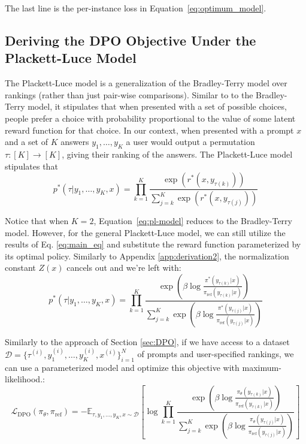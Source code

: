 \documentclass{article}
\newcommand{\piref}{\pi_\text{ref}}
\begin{document}
The last line is the per-instance loss in Equation~\ref{eq:optimum_model}.

\subsection{Deriving the DPO Objective Under the Plackett-Luce Model}
\label{app:plackett_luce_models}
The Plackett-Luce model \citep{plackett1975analysis, luce2012individual} is a generalization of the Bradley-Terry model over rankings (rather than just pair-wise comparisons). Similar to to the Bradley-Terry model, it stipulates that when presented with a set of possible choices, people prefer a choice with probability proportional to the value of some latent reward function for that choice. In our context, when presented with a prompt $x$ and a set of $K$ answers $y_1, \ldots, y_K$ a user would output a permutation $\tau:[K]\to[K]$, giving their ranking of the answers. The Plackett-Luce model stipulates that
\begin{equation}\label{eq:pl-model}
    p^*(\tau| y_1,\ldots, y_K, x)= \prod_{k=1}^{K}\frac{\exp(r^*(x, y_{\tau(k)}))}{\sum_{j=k}^{K}\exp(r^*(x, y_{\tau(j)}))}
\end{equation}

Notice that when $K=2$, Equation~\ref{eq:pl-model} reduces to the Bradley-Terry model. However, for the general Plackett-Luce model, we can still utilize the results of Eq. \ref{eq:main_eq} and substitute the reward function parameterized by its optimal policy. Similarly to Appendix \ref{app:derivation2}, the normalization constant $Z(x)$ cancels out and we're left with:
\begin{equation}
    p^*(\tau| y_1,\ldots, y_K, x)= \prod_{k=1}^{K}\frac{\exp\left(\beta \log \frac{\pi^*(y_{\tau(k)}|x)}{\piref(y_{\tau(k)}|x)}\right)}{\sum_{j=k}^{K}\exp\left(\beta \log \frac{\pi^*(y_{\tau(j)}|x)}{\piref(y_{\tau(j)}|x)}\right)}
\end{equation}

Similarly to the approach of Section \ref{sec:DPO}, if we have access to a dataset $\mathcal{D} = \{\tau^{(i)}, y_1^{(i)}, \ldots, y_K^{(i)}, x^{(i)}\}_{i=1}^N$ of prompts and user-specified rankings, we can use a parameterized model and optimize this objective with maximum-likelihood.:
\begin{equation}
    \mathcal{L}_{\text{DPO}}(\pi_{\theta}, \piref) = -\mathbb{E}_{\tau, y_1, \ldots, y_K, x\sim\mathcal{D}}\left[\log \prod_{k=1}^{K}\frac{\exp\left(\beta \log \frac{\pi_{\theta}(y_{\tau(k)}|x)}{\piref(y_{\tau(k)}|x)}\right)}{\sum_{j=k}^{K}\exp\left(\beta \log \frac{\pi_{\theta}(y_{\tau(j)}|x)}{\piref(y_{\tau(j)}|x)}\right)}\right]
\end{equation}
\end{document}
